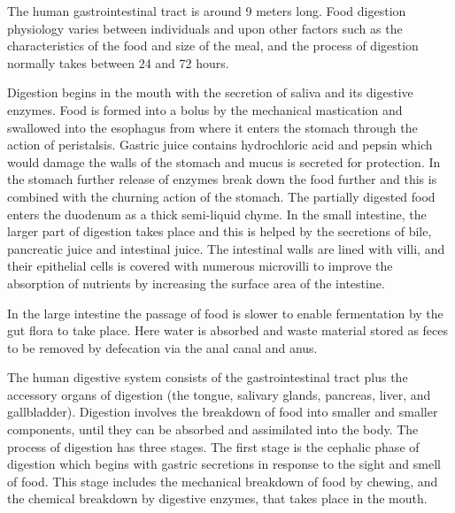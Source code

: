 The human gastrointestinal tract is around 9 meters long. Food digestion physiology varies between individuals and upon other factors such as the characteristics of the food and size of the meal, and the process of digestion normally takes between 24 and 72 hours.

Digestion begins in the mouth with the secretion of saliva and its digestive enzymes. Food is formed into a bolus by the mechanical mastication and swallowed into the esophagus from where it enters the stomach through the action of peristalsis. Gastric juice contains hydrochloric acid and pepsin which would damage the walls of the stomach and mucus is secreted for protection. In the stomach further release of enzymes break down the food further and this is combined with the churning action of the stomach. The partially digested food enters the duodenum as a thick semi-liquid chyme. In the small intestine, the larger part of digestion takes place and this is helped by the secretions of bile, pancreatic juice and intestinal juice. The intestinal walls are lined with villi, and their epithelial cells is covered with numerous microvilli to improve the absorption of nutrients by increasing the surface area of the intestine.

In the large intestine the passage of food is slower to enable fermentation by the gut flora to take place. Here water is absorbed and waste material stored as feces to be removed by defecation via the anal canal and anus.

The human digestive system consists of the gastrointestinal tract plus the accessory organs of digestion (the tongue, salivary glands, pancreas, liver, and gallbladder). Digestion involves the breakdown of food into smaller and smaller components, until they can be absorbed and assimilated into the body. The process of digestion has three stages. The first stage is the cephalic phase of digestion which begins with gastric secretions in response to the sight and smell of food. This stage includes the mechanical breakdown of food by chewing, and the chemical breakdown by digestive enzymes, that takes place in the mouth.



